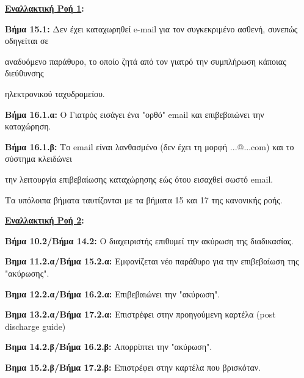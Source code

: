 \documentclass{article}
\begin{document}
 \textbf{\underline{Εναλλακτική Ροή 1}:} \vspace{0.2cm}
\par \textbf{Βήμα 15.1:} Δεν έχει καταχωρηθεί e-mail για τον συγκεκριμένο ασθενή, συνεπώς οδηγείται σε \par αναδυόμενο παράθυρο, το οποίο ζητά από τον γιατρό την συμπλήρωση κάποιας διεύθυνσης \par ηλεκτρονικού ταχυδρομείου.

\vspace{0.2cm}

\par \textbf{Βήμα 16.1.α:} Ο Γιατρός εισάγει ένα "ορθό" email και επιβεβαιώνει την καταχώρηση. \vspace{0.2cm}
\par \textbf{Βήμα 16.1.β:} Το email είναι λανθασμένο (δεν έχει τη μορφή ...@...com) και το σύστημα κλειδώνει \par την λειτουργία επιβεβαίωσης καταχώρησης εώς ότου εισαχθεί σωστό email. \vspace{0.1cm}

\par Τα υπόλοιπα βήματα ταυτίζονται με τα βήματα 15 και 17 της κανονικής ροής.

\vspace{0.2cm}

\textbf{\underline{Εναλλακτική Ροή 2}:} \vspace{0.2cm}
\par \textbf{Βήμα 10.2/Βήμα 14.2:} Ο διαχειριστής επιθυμεί την ακύρωση της διαδικασίας.

\vspace{0.3cm}

\par \textbf{Βημα 11.2.α/Βήμα 15.2.α:} Εμφανίζεται νέο παράθυρο για την επιβεβαίωση της "ακύρωσης". \vspace{0.1cm}
\par \textbf{Βημα 12.2.α/Βήμα 16.2.α:} Επιβεβαιώνει την "ακύρωση". \vspace{0.1cm}
\par \textbf{Βημα 13.2.α/Βήμα 17.2.α:} Επιστρέφει στην προηγούμενη καρτέλα (post discharge guide) \vspace{0.3cm}

\par \textbf{Βημα 14.2.β/Βήμα 16.2.β:}  Απορρίπτει την "ακύρωση". \vspace{0.1cm}
\par \textbf{Βημα 15.2.β/Βήμα 17.2.β:} Επιστρέφει στην καρτέλα που βρισκόταν.
\end{document}
